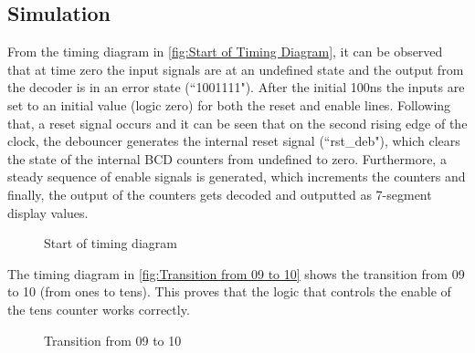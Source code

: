 \documentclass[10pt]{article}
\begin{document}
\subsection{Simulation}
From the timing diagram in \autoref{fig:Start of Timing Diagram}, it can be observed that at time zero the input signals are at an undefined state and the output from the decoder is in an error state (``1001111").
After the initial 100ns the inputs are set to an initial value (logic zero) for both the reset and enable lines.
Following that, a reset signal occurs and it can be seen that on the second rising edge of the clock, the debouncer generates the internal reset signal (``rst\_deb"), which clears the state of the internal BCD counters from undefined to zero.
Furthermore, a steady sequence of enable signals is generated, which increments the counters and finally, the output of the counters gets decoded and outputted as 7-segment display values. 

\begin{figure}[ht]
    \centering
    \caption{Start of timing diagram}
    \label{fig:Start of Timing Diagram}
\end{figure}

The timing diagram in \autoref{fig:Transition from 09 to 10} shows the transition from 09 to 10 (from ones to tens). This proves that the logic that controls the enable of the tens counter works correctly.

\begin{figure}[ht]
    \centering
    \caption{Transition from 09 to 10}
    \label{fig:Transition from 09 to 10}
\end{figure}
\newpage
\end{document}
